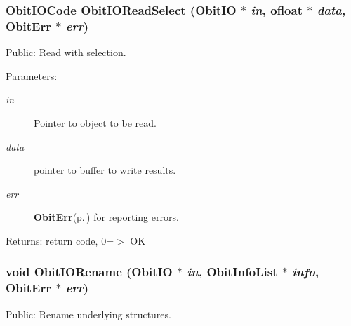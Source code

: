 \subsubsection{\setlength{\rightskip}{0pt plus 5cm}Obit\-IOCode Obit\-IORead\-Select ({\bf Obit\-IO} $\ast$ {\em in}, {\bf ofloat} $\ast$ {\em data}, {\bf Obit\-Err} $\ast$ {\em err})}\label{ObitIO_8c_a19}


Public: Read with selection. 

\begin{Desc}
\item[Parameters:]
\begin{description}
\item[{\em in}]Pointer to object to be read. \item[{\em data}]pointer to buffer to write results. \item[{\em err}]{\bf Obit\-Err}{\rm (p.\,\pageref{structObitErr})} for reporting errors. \end{description}
\end{Desc}
\begin{Desc}
\item[Returns:]return code, 0=$>$ OK \end{Desc}
\subsubsection{\setlength{\rightskip}{0pt plus 5cm}void Obit\-IORename ({\bf Obit\-IO} $\ast$ {\em in}, {\bf Obit\-Info\-List} $\ast$ {\em info}, {\bf Obit\-Err} $\ast$ {\em err})}\label{ObitIO_8c_a10}


Public: Rename underlying structures. 

